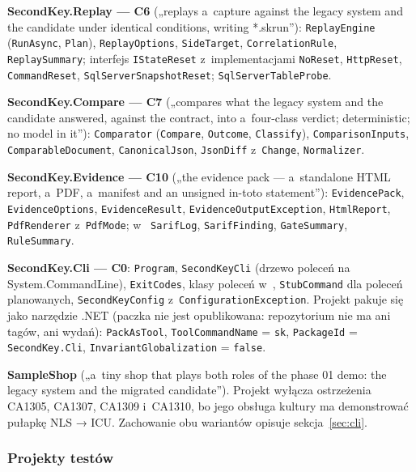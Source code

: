 {\smallskip
\textbf{SecondKey.Replay --- C6} („replays a~capture against the legacy system and the
candidate under identical conditions, writing *.skrun”): \texttt{ReplayEngine}
(\texttt{RunAsync}, \texttt{Plan}), \texttt{ReplayOptions}, \texttt{SideTarget},
\texttt{CorrelationRule}, \texttt{ReplaySummary}; interfejs \texttt{IStateReset} z~implementacjami \texttt{NoReset}, \texttt{HttpReset}, \texttt{CommandReset},
\texttt{SqlServerSnapshotReset}; \texttt{SqlServerTableProbe}.\par
\smallskip
\textbf{SecondKey.Compare --- C7} („compares what the legacy system and the candidate
answered, against the contract, into a~four-class verdict; deterministic; no model in it”):
\texttt{Comparator} (\texttt{Compare}, \texttt{Outcome}, \texttt{Classify}),
\texttt{ComparisonInputs}, \texttt{ComparableDocument}, \texttt{CanonicalJson},
\texttt{JsonDiff} z~\texttt{Change}, \texttt{Normalizer}.\par
\smallskip
\textbf{SecondKey.Evidence --- C10} („the evidence pack --- a~standalone HTML report, a~PDF,
a~manifest and an unsigned in-toto statement”): \texttt{EvidencePack},
\texttt{EvidenceOptions}, \texttt{EvidenceResult}, \texttt{EvidenceOutputException},
\texttt{HtmlReport}, \texttt{PdfRenderer} z~\texttt{PdfMode}; w~
\texttt{SarifLog}, \texttt{SarifFinding}, \texttt{GateSummary}, \texttt{RuleSummary}.\par
\smallskip
\textbf{SecondKey.Cli --- C0}: \texttt{Program}, \texttt{SecondKeyCli} (drzewo poleceń na
System.CommandLine), \texttt{ExitCodes}, klasy poleceń w~,
\texttt{StubCommand} dla poleceń planowanych, \texttt{SecondKeyConfig} z~\texttt{ConfigurationException}. Projekt pakuje się jako narzędzie .NET (paczka
nie jest opublikowana: repozytorium nie ma ani tagów, ani wydań):
\texttt{PackAsTool}, \texttt{ToolCommandName} = \texttt{sk}, \texttt{PackageId} =
\texttt{SecondKey.Cli}, \texttt{InvariantGlobalization} = \texttt{false}.\par
\smallskip
\textbf{SampleShop} („a~tiny shop that plays both roles of the phase 01 demo: the legacy
system and the migrated candidate”). Projekt wyłącza ostrzeżenia CA1305, CA1307, CA1309 i~CA1310, bo jego obsługa kultury ma demonstrować pułapkę NLS → ICU. Zachowanie obu wariantów
opisuje sekcja~\ref{sec:cli}.\par
}

\subsubsection{Projekty testów}

